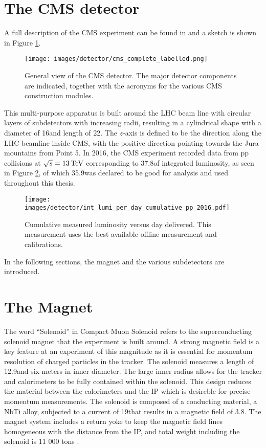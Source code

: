 \section{The CMS detector}
\noindent\justify
A full description of the CMS experiment can be found in \cite{Chatrchyan:2008aa} and a sketch is shown in Figure \ref{fig:CMS}.
\begin{figure}[!htp]
  \centering
   \texttt{[image: images/detector/cms\_complete\_labelled.png]}
   \caption{General view of the CMS detector. The major detector components are indicated, together with the acronyms for the various CMS construction modules.\cite{Chatrchyan:2009hb}}
   \label{fig:CMS}
\end{figure}                                                                                                                                                                                    
This multi-purpose apparatus is built around the LHC beam line with circular layers of subdetectors with increasing radii, resulting in a cylindrical shape with a diameter of 16\m and length of 22\m.
The $z$-axis is defined to be the direction along the LHC beamline inside CMS, with the positive direction pointing towards the Jura mountains from Point 5.  
In 2016, the CMS experiment recorded data from pp collisions at $\sqrt{s}=13\,\text{Te\hspace{-.08em}V}$ corresponding to 37.8\fbinv of integrated luminosity, as seen in Figure \ref{fig:lumi}, of which 35.9\fbinv was declared to be good for analysis and used throughout this thesis. 
\begin{figure}[!htp]
  \centering
   \texttt{[image: images/detector/int\_lumi\_per\_day\_cumulative\_pp\_2016.pdf]}
   \caption{Cumulative measured luminosity versus day delivered. This measurement uses the best available offline measurement and calibrations. \cite{lumi}}
   \label{fig:lumi}
\end{figure}                                                                               
In the following sections, the magnet and the various subdetectors are introduced. 
\section{The Magnet}
\noindent\justify
The word ``Solenoid'' in Compact Muon Solenoid refers to the superconducting solenoid magnet that the experiment is built around. 
A strong magnetic field is a key feature at an experiment of this magnitude as it is essential for momentum resolution of charged particles in the tracker. 
The solenoid measures a length of 12.9\m and six meters in inner diameter. 
The large inner radius allows for the tracker and calorimeters to be fully contained within the solenoid. 
This design reduces the material between the calorimeters and the IP which is desireble for precise momentum measurements. 
The solenoid is composed of a conducting material, a NbTi alloy, subjected to a current of 19\kA that results in a magnetic field of 3.8\T. 
The magnet system includes a return yoke to keep the magnetic field lines homogeneous with the distance from the IP, and total weight including the solenoid is 11 000 tons \cite{CERN-LHCC-97-010}.
